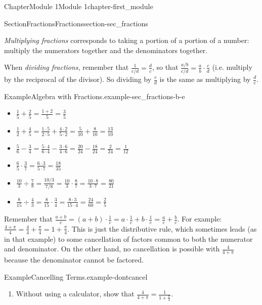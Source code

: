 \documentclass[oneside,10pt,]{book}
\begin{document}
\begin{chapterptx}{Chapter}{Module 1}{}{Module 1}{}{}{chapter-first_module}
\begin{sectionptx}{Section}{Fractions}{}{Fractions}{}{}{section-sec_fractions}
\begin{introduction}{}
\par
{}\emph{Multiplying fractions} corresponds to taking a portion of a portion of a number: multiply the numerators together and the denominators together.%
\par
{}When \emph{dividing fractions}, remember that \(\frac{1}{ c/d} = \frac{d}{c}\), so that \(\frac{a/b}{c/d} = \frac{a}{b} \cdot \frac{c}{d}\) (i.e. multiply by the reciprocal of the divisor).  So dividing by \(\frac{c}{d}\) is the same as multiplying by \(\frac{d}{c}\).%
\begin{example}{Example}{Algebra with Fractions.}{example-sec_fractions-b-e}%
%
\begin{itemize}[label=\textbullet]
\item{}\(\displaystyle \frac{1}{5} + \frac{2}{5} = \frac{1+2}{5}=\frac{3}{5}\)%
\item{}\(\displaystyle \frac{1}{2} + \frac{4}{5} = \frac{1 \cdot 5}{2 \cdot 5}+ \frac{4 \cdot 2}{5 \cdot 2} = \frac{5}{10} + \frac{8}{10} = \frac{13}{10}\)%
\item{}\(\displaystyle \frac{5}{6} - \frac{3}{4} = \frac{5 \cdot 4}{6 \cdot 4} - \frac{3 \cdot 6}{4 \cdot 6} = \frac{20}{24} - \frac{18}{24} = \frac{2}{24} = \frac{1}{12}\)%
\item{}\(\displaystyle \frac{6}{5} \cdot \frac{3}{7} = \frac{6 \cdot 3}{5 \cdot 7} = \frac{18}{35}\)%
\item{}\(\displaystyle \frac{10}{3} \div \frac{7}{8} = \frac{10/3}{7/8} = \frac{10}{3} \cdot \frac{8}{7} = \frac{10 \cdot 8}{3 \cdot 7} = \frac{80}{21}\)%
\item{}\(\displaystyle \frac{8}{15} \div \frac{4}{3} = \frac{8}{15} \cdot \frac{3}{4} = \frac{8 \cdot 3}{15 \cdot 4} = \frac{24}{60} = \frac{2}{5}\)%
\end{itemize}
\end{example}
Remember that \(\frac{a+b}{c}=(a+b)\cdot\frac{1}{c}=a\cdot\frac{1}{c}+b\cdot\frac{1}{c}=\frac{a}{c}+\frac{b}{c}\).  For example: \(\frac{4+\pi}{4}=\frac{4}{4}+\frac{\pi}{4}=1+\frac{\pi}{4}\).  This is just the distributive rule, which sometimes leads (as in that example) to some cancellation of factors common to both the numerator and denominator.  On the other hand, no cancellation is possible with \(\frac{4}{4+\pi}\) because the denominator cannot be factored.%
\begin{example}{Example}{Cancelling Terms.}{example-dontcancel}%
%
\begin{enumerate}
\item{}Without using a calculator, show that \(\frac{4}{4+\pi}=\frac{1}{1+\frac{\pi}{4}}\).%

\end{enumerate}
\end{example}
\end{introduction}
\end{sectionptx}
\end{chapterptx}
\end{document}
